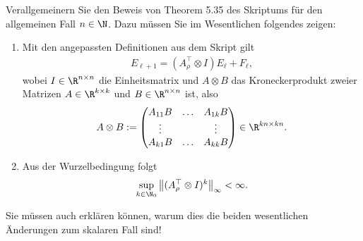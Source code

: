 \begin{exercise}
Verallgemeinern Sie den Beweis von Theorem 5.35 des Skriptums für den allgemeinen
Fall $n \in \N$. Dazu müssen Sie im Wesentlichen folgendes zeigen:
\begin{enumerate}[label = \textbf{\alph*)}]
  \item Mit den angepassten Definitionen aus dem Skript gilt
  \begin{align}
    E_{\ell + 1} = \left(A_{\rho}^{\top} \otimes I\right)E_{\ell} + F_{\ell},
  \end{align}
  wobei $I \in \R^{n \times n}$ die Einheitsmatrix und $A \otimes B$ das Kroneckerprodukt
  zweier Matrizen $A \in \R^{k \times k}$ und $B \in \R^{n \times n}$ ist, also
  \begin{align}
    A \otimes B := \begin{pmatrix}
      A_{11}B & \hdots & A_{1k}B \\
      \vdots & & \vdots \\
      A_{k1}B & \hdots & A_{kk}B
    \end{pmatrix}
    \in \R^{kn \times kn}.
  \end{align}
  \item Aus der Wurzelbedingung folgt
  \begin{align}
    \sup_{k \in \N_0} \left\| (A_{\rho}^{\top} \otimes I)^k\right\|_{\infty} < \infty.
  \end{align}
\end{enumerate}
Sie müssen auch erklären können, warum dies die beiden wesentlichen Änderungen
zum skalaren Fall sind!
\end{exercise}
